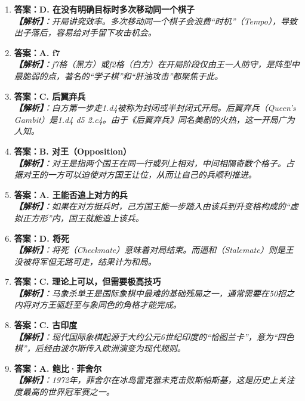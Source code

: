 \documentclass[a4paper, 11pt]{ctexart}
\begin{document}
\begin{enumerate}[label=\arabic*., itemsep=1.5em]
    \item \textbf{答案：D. 在没有明确目标时多次移动同一个棋子} \\
    \textit{\textbf{【解析】}：开局讲究效率。多次移动同一个棋子会浪费“时机”（Tempo），导致出子落后，容易给对手留下攻击机会。}

    \item \textbf{答案：A. f7} \\
    \textit{\textbf{【解析】}：f7格（黑方）或f2格（白方）在开局阶段仅由王一人防守，是阵型中最脆弱的点，著名的“学子棋”和“肝油攻击”都聚焦于此。}

    \item \textbf{答案：C. 后翼弃兵} \\
    \textit{\textbf{【解析】}：白方第一步走1.d4被称为封闭或半封闭式开局。后翼弃兵（Queen's Gambit）是1.d4 d5 2.c4。由于《后翼弃兵》同名美剧的火热，这一开局广为人知。}

    \item \textbf{答案：B. 对王（Opposition）} \\
    \textit{\textbf{【解析】}：对王是指两个国王在同一行或列上相对，中间相隔奇数个格子。占据对王的一方可以迫使对方国王让位，从而让自己的兵顺利推进。}

    \item \textbf{答案：A. 王能否追上对方的兵} \\
    \textit{\textbf{【解析】}：如果在对方挺兵时，己方国王能一步踏入由该兵到升变格构成的“虚拟正方形”内，国王就能追上该兵。}

    \item \textbf{答案：D. 将死} \\
    \textit{\textbf{【解析】}：将死（Checkmate）意味着对局结束。而逼和（Stalemate）则是王没被将军但无路可走，结果计为和局。}

    \item \textbf{答案：C. 理论上可以，但需要极高技巧} \\
    \textit{\textbf{【解析】}：马象杀单王是国际象棋中最难的基础残局之一，通常需要在50招之内将对方王驱赶至与象同色的角格才能完成。}

    \item \textbf{答案：C. 古印度} \\
    \textit{\textbf{【解析】}：现代国际象棋起源于大约公元6世纪印度的“恰图兰卡”，意为“四色棋”，后经由波尔斯传入欧洲演变为现代规则。}

    \item \textbf{答案：A. 鲍比·菲舍尔} \\
    \textit{\textbf{【解析】}：1972年，菲舍尔在冰岛雷克雅未克击败斯帕斯基，这是历史上关注度最高的世界冠军赛之一。}


\end{enumerate}
\end{document}
